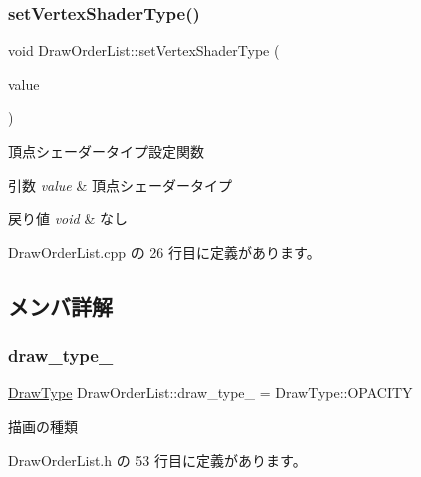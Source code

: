 \subsubsection{\texorpdfstring{set\+Vertex\+Shader\+Type()}{setVertexShaderType()}}
{\footnotesize\ttfamily void Draw\+Order\+List\+::set\+Vertex\+Shader\+Type (\begin{DoxyParamCaption}\item[{\mbox{\hyperlink{class_shader_manager_a9b51e49d70eb3cc58f6d1f3994e8cfbd}{Shader\+Manager\+::\+Vertex\+Shader\+Type}}}]{value }\end{DoxyParamCaption})}



頂点シェーダータイプ設定関数 


\begin{DoxyParams}{引数}
{\em value} & 頂点シェーダータイプ \\
\hline
\end{DoxyParams}

\begin{DoxyRetVals}{戻り値}
{\em void} & なし \\
\hline
\end{DoxyRetVals}


 Draw\+Order\+List.\+cpp の 26 行目に定義があります。



\subsection{メンバ詳解}
\mbox{\label{class_draw_order_list_ad2ce43c1b177ba4dae4198aa272eeb23}} 
\subsubsection{\texorpdfstring{draw\+\_\+type\+\_\+}{draw\_type\_}}
{\footnotesize\ttfamily \mbox{\hyperlink{class_draw_order_list_a6c9b9ceb312c16d399ef355f4f3486bb}{Draw\+Type}} Draw\+Order\+List\+::draw\+\_\+type\+\_\+ = Draw\+Type\+::\+O\+P\+A\+C\+I\+TY\hspace{0.3cm}{\ttfamily [private]}}



描画の種類 



 Draw\+Order\+List.\+h の 53 行目に定義があります。

